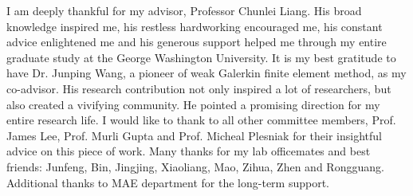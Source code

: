 \begin{acknowledgements}

I am deeply thankful for my advisor, Professor Chunlei Liang. His broad knowledge inspired me, his restless hardworking  encouraged me, his constant advice enlightened me and his generous support helped me through my entire graduate study at the George Washington University. It is my best gratitude to have Dr. Junping Wang, a pioneer of weak Galerkin finite element method, as my co-advisor. His research contribution not only inspired a lot of researchers, but also created a vivifying community. He pointed a promising direction for my entire research life. I would like to thank to all other committee members, Prof. James Lee, Prof. Murli Gupta and Prof. Micheal Plesniak for their insightful advice on this piece of work. Many thanks for my lab officemates and best friends: Junfeng, Bin, Jingjing, Xiaoliang, Mao, Zihua, Zhen and Rongguang. Additional thanks to MAE department for the long-term support.

\end{acknowledgements}
